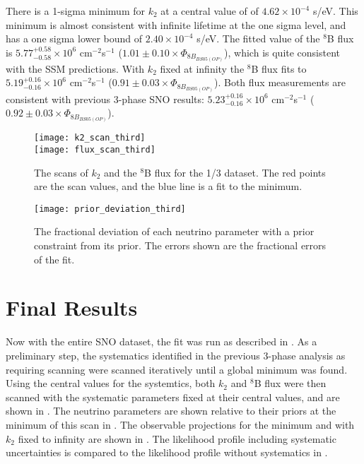 There is a 1-sigma minimum for $k_2$ at a central value of of $4.62\times10^{-4}$ s/eV.
This minimum is almost consistent with infinite lifetime at the one sigma level, and has a one sigma lower bound of $2.40\times10^{-4}$ s/eV.
The fitted value of the $^8$B flux is $5.77^{+0.58}_{-0.58}\times10^6$ cm$^{-2}$s$^{-1}$ ($1.01\pm0.10 \times \Phi_{8B_{BS05(OP)}}$), which is quite consistent with the SSM predictions.
With $k_2$ fixed at infinity the $^8$B flux fits to $5.19^{+0.16}_{-0.16}\times10^6$ cm$^{-2}$s$^{-1}$ ($0.91\pm0.03 \times \Phi_{8B_{BS05(OP)}}$).
Both flux measurements are consistent with previous 3-phase SNO results: $5.23^{+0.16}_{-0.16}\times10^6$ cm$^{-2}$s$^{-1}$ ($0.92\pm0.03 \times \Phi_{8B_{BS05(OP)}}$).

\begin{figure}
\centering
\texttt{[image: k2\_scan\_third]} \\
\vspace{12pt}
\texttt{[image: flux\_scan\_third]}
\caption{The scans of $k_2$ and the $^8$B flux for the 1/3 dataset. The red points are the scan values, and the blue line is a fit to the minimum.}
\label{fig:third_scans}
\end{figure}

\begin{figure}
\centering
\texttt{[image: prior\_deviation\_third]}
\caption{The fractional deviation of each neutrino parameter with a prior constraint from its prior. The errors shown are the fractional errors of the fit.}
\label{fig:priors_third}
\end{figure}

\clearpage

\section{Final Results}
\label{final}

Now with the entire SNO dataset, the fit was run as described in . 
As a preliminary step, the systematics identified in the previous 3-phase analysis as requiring scanning were scanned iteratively until a global minimum was found.
Using the central values for the systemtics, both $k_2$ and $^8$B flux were then scanned with the systematic parameters fixed at their central values, and are shown in .
The neutrino parameters are shown relative to their priors at the minimum of this scan in .
The observable projections for the minimum and with $k_2$ fixed to infinity are shown in .
The likelihood profile including systematic uncertainties is compared to the likelihood profile without systematics in .

